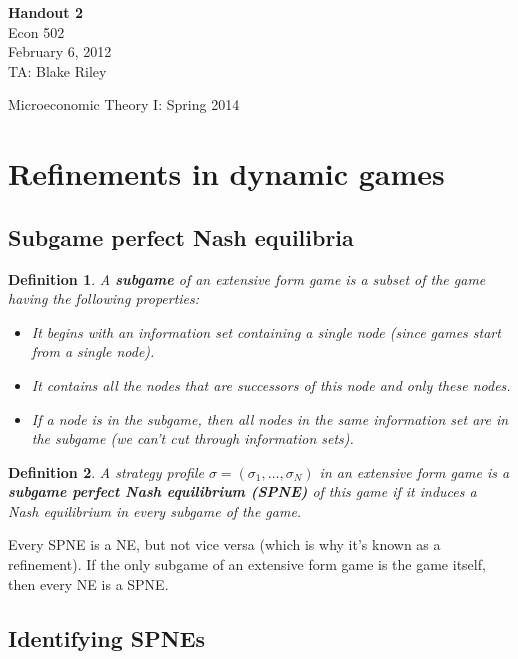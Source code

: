 \documentclass[letter, 11pt]{article}
\theoremstyle{basic}
\newtheorem{definition}{Definition}[section]
\begin{document}
\begin{spacing}{1.0}

\noindent
\textbf{Handout 2} \\
Econ 502 \\
February 6, 2012 \\
TA: Blake Riley \\

\begin{center}
{\Large Microeconomic Theory I: Spring 2014}
\end{center}

\section{Refinements in dynamic games}

\subsection{Subgame perfect Nash equilibria}

\begin{definition}
  A \textbf{subgame} of an extensive form game is a subset of the
  game having the following properties:
  \begin{itemize}
  \item It begins with an information set containing a
    single node (since games start from a single node).
  \item It contains all the nodes that are successors of
    this node and only these nodes.
  \item If a node is in the subgame, then all nodes in
    the same information set are in the subgame (we can't
    cut through information sets).
  \end{itemize}
\end{definition}

\begin{definition}
  A strategy profile $\sigma = (\sigma_1, \ldots, \sigma_N)$ in an
  extensive form game is a \textbf{subgame perfect Nash equilibrium (SPNE)}
  of this game if it induces a Nash equilibrium in every subgame of the
  game.
\end{definition}

Every SPNE is a NE, but not vice versa (which is why it's known as a
refinement). If the only subgame of an extensive form game is the game
itself, then every NE is a SPNE.

\subsection{Identifying SPNEs}


\end{spacing}
\end{document}
